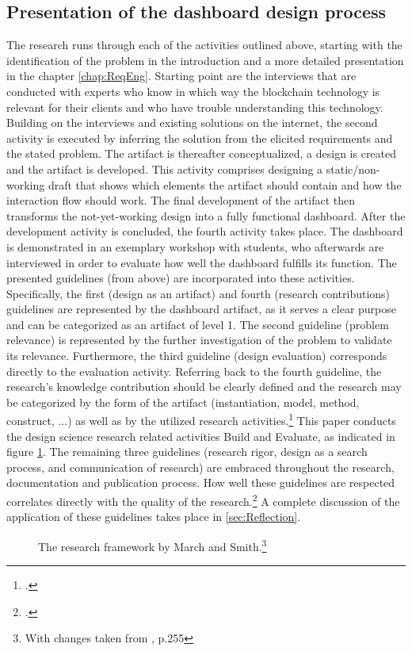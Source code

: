 \subsection{Presentation of the dashboard design process}
The research runs through each of the activities outlined above, starting with the identification of the problem in the introduction and a more detailed presentation in the chapter \ref{chap:ReqEng}. Starting point are the interviews that are conducted with experts who know in which way the blockchain technology is relevant for their clients and who have trouble understanding this technology. Building on the interviews and existing solutions on the internet, the second activity is executed by inferring the solution from the elicited requirements and the stated problem. The artifact is thereafter conceptualized, a design is created and the artifact is developed. This activity comprises designing a static/non-working draft that shows which elements the artifact should contain and how the interaction flow should work. The final development of the artifact then transforms the not-yet-working design into a fully functional dashboard. After the development activity is concluded, the fourth activity takes place. The dashboard is demonstrated in an exemplary workshop with students, who afterwards are interviewed in order to evaluate how well the dashboard fulfills its function. The presented guidelines (from above) are incorporated into these activities. Specifically, the first (design as an artifact) and fourth (research contributions) guidelines are represented by the dashboard artifact, as it serves a clear purpose and can be categorized as an artifact of level 1. The second guideline (problem relevance) is represented by the further investigation of the problem to validate its relevance. Furthermore, the third guideline (design evaluation) corresponds directly to the evaluation activity. Referring back to the fourth guideline, the research's knowledge contribution should be clearly defined and the research may be categorized by the form of the artifact (instantiation, model, method, construct, ...) as well as by the utilized research activities.\footcite[Cf.][p.255]{MarchDesignnaturalscience1995} This paper conducts the design science research related activities Build and Evaluate, as indicated in figure \ref{fig:researchFR}. The remaining three guidelines (research rigor, design as a search process, and communication of research) are embraced throughout the research, documentation and publication process. How well these guidelines are respected correlates directly with the quality of the research.\footcite[Cf.][p.19]{HevnerDesignResearchInformation2010} A complete discussion of the application of these guidelines takes place in \ref{sec:Reflection}.

\begin{figure}
    \centering
    
    \caption[The research framework by March and Smith.]{The research framework by March and Smith.\footnote{With changes taken from \cite{MarchDesignnaturalscience1995}, p.255}}
    \label{fig:researchFR}
\end{figure}
